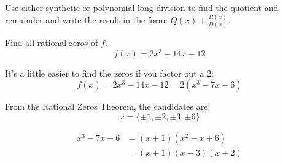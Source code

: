 \documentclass[fleqn,addpoints]{exam}
\begin{document}
\begin{questions}
\begin{parts}
      \end{parts}

    \question Use either synthetic or polynomial long division to find the quotient and remainder and write the result
      in the form: $Q(x) + \frac{R(x)}{D(x)}$.


    \question[10] Find all rational zeros of $f$.
    \[
      f(x) = 2x^3 - 14x - 12
    \]

    \begin{solution}
      It's a little easier to find the zeros if you factor out a 2:
      \[
        f(x) = 2x^3 - 14x - 12 = 2\left( x^3 - 7x - 6 \right)
      \]

      From the Rational Zeros Theorem, the candidates are: 
      \[
        x = \{\pm 1, \pm 2, \pm 3, \pm 6 \}
      \]

      \begin{align*}
        x^3 - 7x - 6 &= (x + 1) (x^2 - x + 6) \\
                     &= (x + 1) (x - 3) (x + 2) \\
      \end{align*}


\end{solution}
\end{questions}
\end{document}
